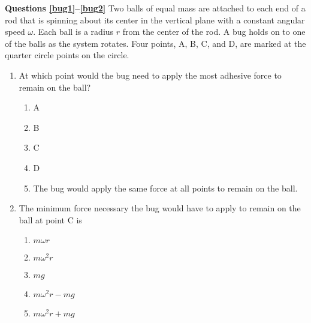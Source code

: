 \documentclass{../../../oss-classkick}
\begin{document}
\begin{multicols*}{2}
  \begin{center}
  \end{center}
  \textbf{Questions \ref{bug1}--\ref{bug2}} Two balls of equal mass are attached
  to each end of a rod that is spinning about its center in the vertical plane
  with a constant angular speed $\omega$. Each ball is a radius $r$ from the
  center of the rod. A bug holds on to one of the balls as the system rotates.
  Four points, A, B, C, and D, are marked at the quarter circle points on the
  circle.
  \begin{enumerate}[leftmargin=18pt,resume]
  \item At which point would the bug need to apply the most adhesive force to
    remain on the ball?
    \begin{enumerate}[nosep,leftmargin=18pt,label=(\Alph*)]
    \item A
    \item B
    \item C
    \item D
    \item The bug would apply the same force at all points to remain on the
      ball.
    \end{enumerate}
    \label{bug1}
    \vspace{.7in}
    
  \item The minimum force necessary the bug would have to apply to remain
    on the ball at point C is
    \begin{enumerate}[nosep,leftmargin=18pt,label=(\Alph*)]
    \item $m\omega r$
    \item $m\omega^2r$
    \item $mg$
    \item $m\omega^2r-mg$
    \item $m\omega^2r+mg$
    \end{enumerate}
    \label{bug2}
  \end{enumerate}
\end{multicols*}
\newpage
\end{document}
